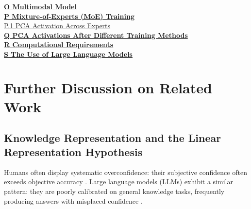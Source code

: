 \documentclass{article} %
\begin{document}
\vspace{0.5em}
\noindent \textbf{\hyperref[app:vision]{O \quad Multimodal Model}} \dotfill \textbf{\pageref{app:vision}} \\

\vspace{0.5em}
\noindent \textbf{\hyperref[app:moe]{P \quad Mixture-of-Experts (MoE) Training}} \dotfill \textbf{\pageref{app:moe}} \\
\phantom{P}\quad \hyperref[app:pca_experts]{P.1 \quad PCA Activation Across Experts} \dotfill \pageref{app:pca_experts} \\

\vspace{0.5em}
\noindent \textbf{\hyperref[app:pca]{Q \quad PCA Activations After Different Training Methods}} \dotfill \textbf{\pageref{app:pca}} \\

\vspace{0.5em}
\noindent \textbf{\hyperref[app:comptational_req]{R \quad Computational Requirements}} \dotfill \textbf{\pageref{app:comptational_req}} \\

\vspace{0.5em}
\noindent \textbf{\hyperref[app:llm_use]{S \quad The Use of Large Language Models}} \dotfill \textbf{\pageref{app:llm_use}} \\

\newpage
\section{Further Discussion on Related Work}
\label{app:related_work}
\subsection{Knowledge Representation and the Linear Representation Hypothesis}
\label{app:linear_rep}

Humans often display systematic overconfidence: their subjective confidence often exceeds objective accuracy \citep{pallier2002role, stankov1996confidence}. Large language models (LLMs) exhibit a similar pattern: they are poorly calibrated on general knowledge tasks, frequently producing answers with misplaced confidence \citep{kadavath2022languagemodelsmostlyknow, yin2023knowwhattheydontknown, yona2024largelanguagemodelsfaithfully, zhang2025reasoningmodelsknowtheyre}.
\end{document}
